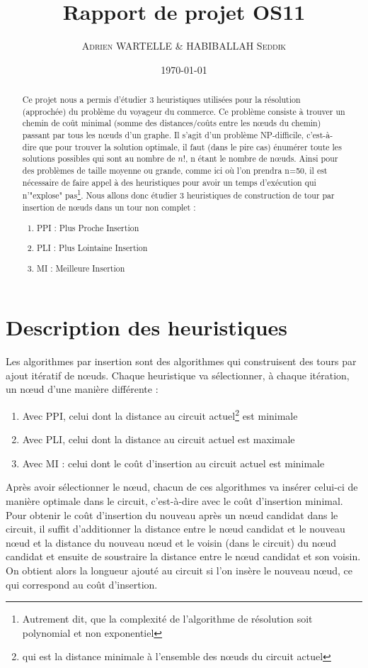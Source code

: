 \documentclass[10pt,a4paper]{article}
\author{\textsc{Adrien WARTELLE} \& \textsc{HABIBALLAH Seddik}}
\title{Rapport de projet OS11}
\date{\today}
\begin{document}
\maketitle
\renewcommand{\contentsname}{Sommaire}
\tableofcontents
\clearpage

\begin{abstract}
Ce projet nous a permis d'étudier 3 heuristiques utilisées pour la résolution (approchée) du problème du voyageur du commerce. Ce problème consiste à trouver un chemin de coût minimal (somme des distances/coûts entre les nœuds du chemin) passant par tous les nœuds d'un graphe. Il s'agit d'un problème NP-difficile, c'est-à-dire que pour trouver la solution optimale, il faut (dans le pire cas) énumérer toute les solutions possibles qui sont au nombre de $n!$, n étant le nombre de nœuds.
Ainsi pour des problèmes de taille moyenne ou grande, comme ici où l'on prendra n=50, il est nécessaire de faire appel à des heuristiques pour avoir un temps d'exécution qui n'"explose" pas\footnote{Autrement dit, que la complexité de l'algorithme de résolution soit polynomial et non exponentiel}. Nous allons donc étudier 3 heuristiques de construction de tour par insertion de nœuds dans un tour non complet : \begin{enumerate}
\item PPI : Plus Proche Insertion
\item PLI : Plus Lointaine Insertion
\item MI : Meilleure Insertion
\end{enumerate}
\end{abstract}

\section{Description des heuristiques}

Les algorithmes par insertion sont des algorithmes qui construisent des tours par 
ajout itératif de nœuds. Chaque heuristique va sélectionner, à chaque itération,
 un nœud d'une manière différente :
 \begin{enumerate}
\item Avec PPI, celui dont la distance au circuit actuel\footnote{qui est la distance minimale
à l'ensemble des nœuds du circuit actuel} est minimale
\item Avec PLI, celui dont la distance au circuit actuel est maximale
\item Avec MI : celui dont le coût d'insertion au circuit actuel est minimale
\end{enumerate}
Après avoir sélectionner le nœud, chacun de ces algorithmes va insérer celui-ci de manière optimale
dans le circuit, c'est-à-dire avec le coût d'insertion minimal. Pour obtenir le coût d'insertion du nouveau après
un nœud candidat dans le circuit, il suffit d'additionner la distance entre le nœud candidat et le nouveau nœud et
la distance du nouveau nœud et le voisin (dans le circuit) du nœud candidat et ensuite de soustraire la distance entre le nœud candidat
et son voisin. On obtient alors la longueur ajouté au circuit si l'on insère le nouveau nœud, ce qui correspond au coût
d'insertion.
\end{document}
